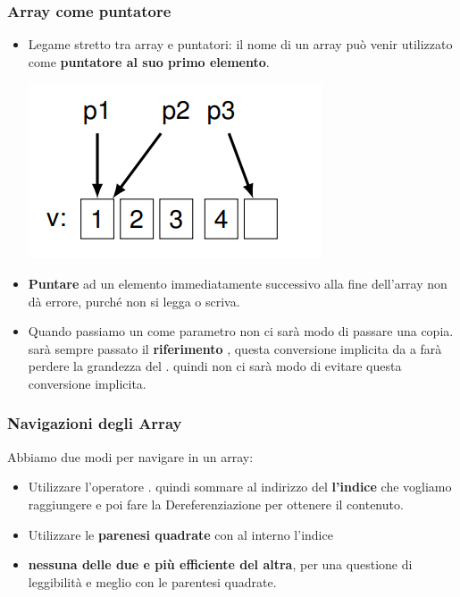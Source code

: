 \subsubsection{Array come puntatore}
\begin{itemize}
    \item Legame stretto tra array e puntatori: il nome di un array
    può venir utilizzato come \textbf{puntatore al suo primo elemento}.
    
    \begin{center}
        \includegraphics[scale = 0.6]{Capitoli/Tipi di dato/Esempi/EsPtrArray.png}
    \end{center}
    \item \textbf{Puntare} ad un elemento immediatamente successivo alla
    fine dell’array non dà errore, purché non si legga o scriva.
    \item Quando passiamo un  come parametro non ci sarà modo di passare una copia. sarà sempre passato il \textbf{riferimento} , questa conversione implicita da \textcolor{blue}{} a  \textcolor{blue}{} farà perdere la grandezza del .
    quindi non ci sarà modo di evitare questa conversione implicita.
    
\end{itemize}
\newpage
\subsubsection{Navigazioni degli Array}
Abbiamo due modi per navigare in un array:
\begin{itemize}
    \item Utilizzare l'operatore \textcolor{blue}{\code{*}}. quindi sommare al indirizzo del  \textbf{l'indice} che vogliamo raggiungere e poi fare la Dereferenziazione per ottenere il contenuto.
    \item Utilizzare le \textbf{parenesi quadrate} con al interno l'indice
    \item \textbf{nessuna delle due e più efficiente del altra}, per una questione di leggibilità e meglio con le parentesi quadrate.
    
\end{itemize}

